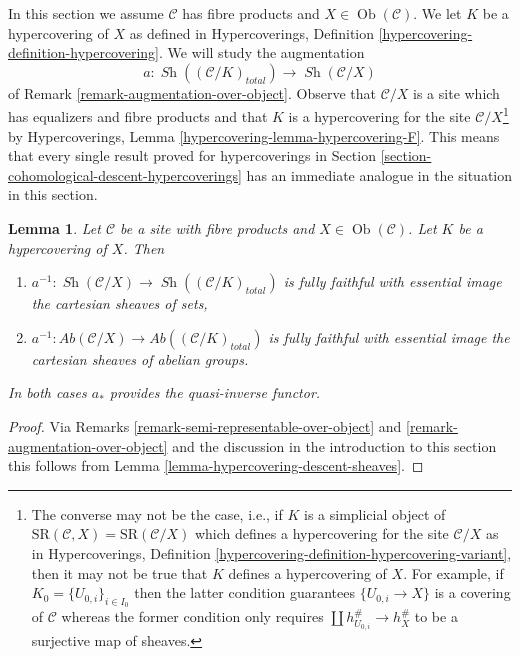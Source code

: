 \documentclass{stacks-project}
\theoremstyle{plain}
\newtheorem{lemma}[subsection]{Lemma}
\theoremstyle{definition}
\theoremstyle{remark}
\numberwithin{equation}{subsection}
\def\Ob{\mathop{\mathrm{Ob}}\nolimits}
\def\Sh{\mathop{\mathit{Sh}}\nolimits}
\begin{document}
\noindent
In this section we assume $\mathcal{C}$ has fibre products
and $X \in \Ob(\mathcal{C})$. We let $K$ be a hypercovering of $X$
as defined in
Hypercoverings, Definition \ref{hypercovering-definition-hypercovering}.
We will study the augmentation
$$
a : \Sh((\mathcal{C}/K)_{total}) \longrightarrow \Sh(\mathcal{C}/X)
$$
of Remark \ref{remark-augmentation-over-object}.
Observe that $\mathcal{C}/X$ is a site which has equalizers
and fibre products and that $K$ is a
hypercovering for the site $\mathcal{C}/X$\footnote{The converse may not
be the case, i.e., if $K$ is a simplicial object of
$\text{SR}(\mathcal{C}, X) = \text{SR}(\mathcal{C}/X)$
which defines a hypercovering for the site $\mathcal{C}/X$ as in
Hypercoverings, Definition \ref{hypercovering-definition-hypercovering-variant},
then it may not be true that $K$ defines a hypercovering of $X$.
For example, if $K_0 = \{U_{0, i}\}_{i \in I_0}$
then the latter condition guarantees
$\{U_{0, i} \to X\}$ is a covering of $\mathcal{C}$
whereas the former condition only requires
$\coprod h_{U_{0, i}}^\# \to h_X^\#$ to be a surjective map
of sheaves.} by Hypercoverings, Lemma
\ref{hypercovering-lemma-hypercovering-F}.
This means that every single result proved for hypercoverings
in Section \ref{section-cohomological-descent-hypercoverings}
has an immediate analogue in the situation in this section.

\begin{lemma}
\label{lemma-hypercovering-X-descent-sheaves}
Let $\mathcal{C}$ be a site with fibre products and $X \in \Ob(\mathcal{C})$.
Let $K$ be a hypercovering of $X$. Then
\begin{enumerate}
\item $a^{-1} : \Sh(\mathcal{C}/X) \to \Sh((\mathcal{C}/K)_{total})$
is fully faithful with essential image the cartesian sheaves of sets,
\item $a^{-1} : \textit{Ab}(\mathcal{C}/X) \to
\textit{Ab}((\mathcal{C}/K)_{total})$
is fully faithful with essential image the cartesian sheaves
of abelian groups.
\end{enumerate}
In both cases $a_*$ provides the quasi-inverse functor.
\end{lemma}

\begin{proof}
Via Remarks \ref{remark-semi-representable-over-object} and
\ref{remark-augmentation-over-object} and the discussion in
the introduction to this section
this follows from Lemma \ref{lemma-hypercovering-descent-sheaves}.
\end{proof}
\end{document}
